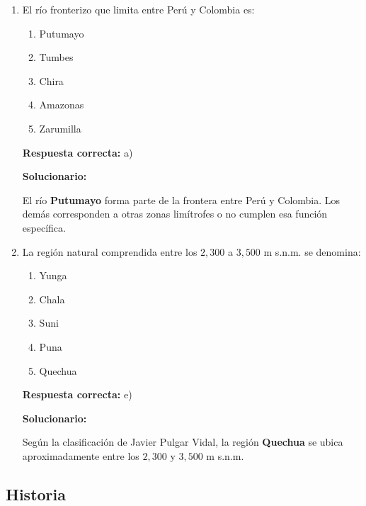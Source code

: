 \begin{enumerate}[resume]
	
	
	\item El río fronterizo que limita entre Perú y Colombia es:
	\begin{enumerate}[label=\alph*)]
		\item Putumayo
		\item Tumbes
		\item Chira
		\item Amazonas
		\item Zarumilla
	\end{enumerate}
	\textbf{Respuesta correcta:} a)
	
	\vspace{2mm}
	\textbf{Solucionario:}
	
	El río \textbf{Putumayo} forma parte de la frontera entre Perú y Colombia.  
	Los demás corresponden a otras zonas limítrofes o no cumplen esa función específica.
	
	\vspace{6mm}
	
	\item La región natural comprendida entre los $2,300$ a $3,500$ m s.n.m. se denomina:
	\begin{enumerate}[label=\alph*)]
		\item Yunga
		\item Chala
		\item Suni
		\item Puna
		\item Quechua
	\end{enumerate}
	\textbf{Respuesta correcta:} e)
	
	\vspace{2mm}
	\textbf{Solucionario:}
	
	Según la clasificación de Javier Pulgar Vidal, la región \textbf{Quechua} se ubica aproximadamente entre los $2,300$ y $3,500$ m s.n.m.
	
	\vspace{6mm}
	
\end{enumerate}

\subsection*{Historia}

